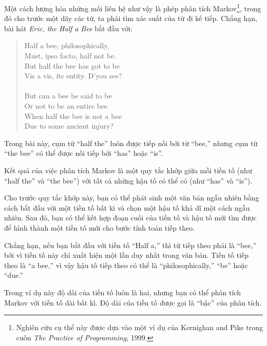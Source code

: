 \documentclass[11pt]{book}
\begin{document}
Một cách lượng hóa những mối liên hệ như vậy là phép phân tích
Markov\footnote{Nghiên cứu cụ thể này được dựa vào một ví dụ của 
  Kernighan and Pike trong cuốn {\em The Practice of Programming}, 1999.}, 
trong đó cho trước một dãy các từ, ta phải tìm xác suất của từ 
đi kế tiếp. Chẳng hạn, bài hát {\em Eric, the Half a
  Bee} bắt đầu với:

\begin{quote}
Half a bee, philosophically, \\
Must, ipso facto, half not be. \\
But half the bee has got to be \\
Vis a vis, its entity. D'you see? \\
\\
But can a bee be said to be \\
Or not to be an entire bee \\
When half the bee is not a bee \\
Due to some ancient injury? \\
\end{quote}
%
Trong bài này,
cụm từ ``half the'' luôn được tiếp nối bởi từ ``bee,''
nhưng cụm từ ``the bee'' có thể được nối tiếp bởi 
``has'' hoặc ``is''.


Kết quả của việc phân tích Markov là một quy tắc khớp giữa mỗi tiền tố
(như ``half the'' và ``the bee'') với tất cả những hậu tố có thể có 
(như ``has'' và ``is'').


Cho trước quy tắc khớp này, bạn có thể phát sinh một văn bản ngẫu nhiên
bằng cách bắt đầu với một tiền tố bất kì và chọn một hậu tố khả dĩ một
cách ngẫu nhiên. Sau đó, bạn có thể kết hợp đoạn cuối của tiền tố và 
hậu tố mới tìm được để hình thành một tiền tố mới cho bước tính toán 
tiếp theo.

Chẳng hạn, nếu bạn bắt đầu với tiền tố ``Half a,'' thì từ tiếp theo 
phải là ``bee,'' bởi vì tiền tố này chỉ xuất hiện một lần duy nhất trong văn bản. 
Tiền tố tiếp theo là ``a bee,'' vì vậy hậu tố tiếp theo có thể là ``philosophically,'' 
``be'' hoặc ``due.''

Trong ví dụ này độ dài của tiền tố luôn là hai, nhưng bạn có thể phân tích
Markov với tiền tố dài bất kì. Độ dài của tiền tố được gọi
là ``bậc'' của phân tích.
\end{document}

